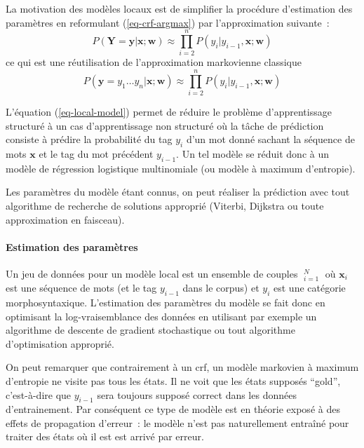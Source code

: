 \documentclass[11pt,openany]{book}
\begin{document}
La motivation des modèles locaux est de simplifier la procédure d'estimation  des paramètres 
en reformulant (\ref{eq-crf-argmax}) par l'approximation suivante~:
\begin{equation}
\label{eq-local-model}
P(\mathbf{Y}=\mathbf{y} | \mathbf{x} ; \mathbf{w}) \approx \prod_{i=2}^n P(y_i | y_{i-1}, \mathbf{x} ; \mathbf{w})
\end{equation}
ce qui est une réutilisation de l'approximation markovienne classique 
\begin{displaymath}
P(\mathbf{y} = y_1\ldots y_n | \mathbf{x};\mathbf{w}) \approx \prod_{i=2}^n P(y_i|y_{i-1},\mathbf{x};\mathbf{w})
\end{displaymath}

L'équation (\ref{eq-local-model}) permet de réduire le problème d'apprentissage structuré à un cas d'apprentissage 
non structuré où la tâche de prédiction consiste à prédire la probabilité du tag $y_i$ d'un mot donné sachant la séquence de mots 
$\mathbf{x}$ et le tag du mot précédent $y_{i-1}$.  
Un tel modèle se réduit donc à un modèle de régression logistique multinomiale (ou modèle à maximum d'entropie).

Les paramètres du modèle étant connus, on peut réaliser la prédiction avec tout algorithme de recherche de solutions approprié
(Viterbi, Dijkstra ou toute approximation en faisceau).

\paragraph{Estimation des paramètres}
Un jeu de données pour un modèle local est un ensemble de couples $\mathop{(\mathbf{x}_i y_{i-1}, y_i)}_{i=1}^N$
où $\mathbf{x}_i$ est une séquence de mots (et le tag $y_{i-1}$ dans le corpus)  et $y_i$ est une catégorie morphosyntaxique.
L'estimation des paramètres du modèle se fait donc en optimisant la log-vraisemblance des données en utilisant par exemple un algorithme de descente
de gradient stochastique ou tout algorithme d'optimisation approprié.


On peut remarquer que contrairement à un {\sc crf}, un modèle markovien à maximum d'entropie ne visite pas tous les états.
Il ne voit que les états supposés ``gold'', c'est-à-dire que $y_{i-1}$ sera toujours supposé correct dans les données d'entrainement.
Par conséquent ce type de modèle est en théorie exposé à des effets de propagation d'erreur~: le modèle n'est pas naturellement entraîné pour traiter des 
états où il est est arrivé par erreur.
\end{document}

